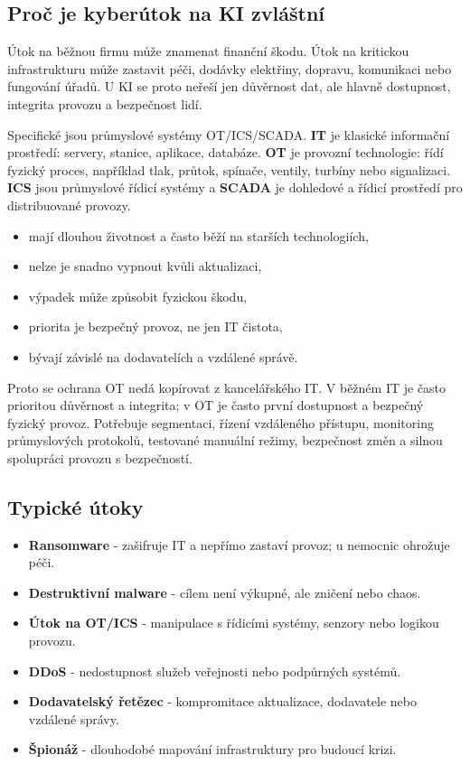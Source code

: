 \subsection*{Proč je kyberútok na KI zvláštní}
Útok na běžnou firmu může znamenat finanční škodu. Útok na kritickou infrastrukturu může zastavit péči, dodávky elektřiny, dopravu, komunikaci nebo fungování úřadů. U KI se proto neřeší jen důvěrnost dat, ale hlavně dostupnost, integrita provozu a bezpečnost lidí.

Specifické jsou průmyslové systémy OT/ICS/SCADA. \textbf{IT} je klasické informační prostředí: servery, stanice, aplikace, databáze. \textbf{OT} je provozní technologie: řídí fyzický proces, například tlak, průtok, spínače, ventily, turbíny nebo signalizaci. \textbf{ICS} jsou průmyslové řídicí systémy a \textbf{SCADA} je dohledové a řídicí prostředí pro distribuované provozy.
\begin{itemize}
  \item mají dlouhou životnost a často běží na starších technologiích,
  \item nelze je snadno vypnout kvůli aktualizaci,
  \item výpadek může způsobit fyzickou škodu,
  \item priorita je bezpečný provoz, ne jen IT čistota,
  \item bývají závislé na dodavatelích a vzdálené správě.
\end{itemize}
Proto se ochrana OT nedá kopírovat z kancelářského IT. V běžném IT je často prioritou důvěrnost a integrita; v OT je často první dostupnost a bezpečný fyzický provoz. Potřebuje segmentaci, řízení vzdáleného přístupu, monitoring průmyslových protokolů, testované manuální režimy, bezpečnost změn a silnou spolupráci provozu s bezpečností.

\subsection*{Typické útoky}
\begin{itemize}
  \item \textbf{Ransomware} - zašifruje IT a nepřímo zastaví provoz; u nemocnic ohrožuje péči.
  \item \textbf{Destruktivní malware} - cílem není výkupné, ale zničení nebo chaos.
  \item \textbf{Útok na OT/ICS} - manipulace s řídicími systémy, senzory nebo logikou provozu.
  \item \textbf{DDoS} - nedostupnost služeb veřejnosti nebo podpůrných systémů.
  \item \textbf{Dodavatelský řetězec} - kompromitace aktualizace, dodavatele nebo vzdálené správy.
  \item \textbf{Špionáž} - dlouhodobé mapování infrastruktury pro budoucí krizi.
\end{itemize}

